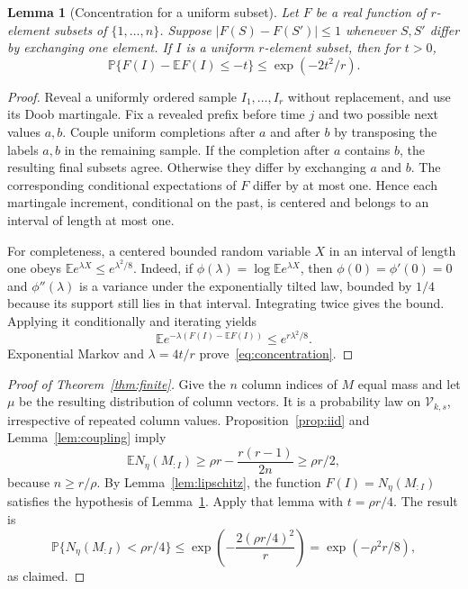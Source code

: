 \documentclass[11pt,a4paper]{article}
\newtheorem{lemma}[theorem]{Lemma}
\theoremstyle{remark}\newtheorem{remark}[theorem]{Remark}
\newcommand{\E}{\mathbb E}
\newcommand{\Prob}{\mathbb P}
\begin{document}
\begin{lemma}[Concentration for a uniform subset]\label{lem:concentration}
Let $F$ be a real function of $r$-element subsets of $\{1,\ldots,n\}$. Suppose $|F(S)-F(S')|\le1$ whenever $S,S'$ differ by exchanging one element. If $I$ is a uniform $r$-element subset, then for $t>0$,
\begin{equation}\label{eq:concentration}
 \Prob\{F(I)-\E F(I)\le-t\}\le\exp(-2t^2/r).
\end{equation}
\end{lemma}
\begin{proof}
Reveal a uniformly ordered sample $I_1,\ldots,I_r$ without replacement, and use its Doob martingale. Fix a revealed prefix before time $j$ and two possible next values $a,b$. Couple uniform completions after $a$ and after $b$ by transposing the labels $a,b$ in the remaining sample. If the completion after $a$ contains $b$, the resulting final subsets agree. Otherwise they differ by exchanging $a$ and $b$. The corresponding conditional expectations of $F$ differ by at most one. Hence each martingale increment, conditional on the past, is centered and belongs to an interval of length at most one.

For completeness, a centered bounded random variable $X$ in an interval of length one obeys $\E e^{\lambda X}\le e^{\lambda^2/8}$. Indeed, if $\phi(\lambda)=\log\E e^{\lambda X}$, then $\phi(0)=\phi'(0)=0$ and $\phi''(\lambda)$ is a variance under the exponentially tilted law, bounded by $1/4$ because its support still lies in that interval. Integrating twice gives the bound. Applying it conditionally and iterating yields
\[
 \E e^{-\lambda(F(I)-\E F(I))}\le e^{r\lambda^2/8}.
\]
Exponential Markov and $\lambda=4t/r$ prove~\eqref{eq:concentration}.
\end{proof}

\begin{proof}[Proof of Theorem~\ref{thm:finite}]
Give the $n$ column indices of $M$ equal mass and let $\mu$ be the resulting distribution of column vectors. It is a probability law on $\mathcal V_{k,s}$, irrespective of repeated column values. Proposition~\ref{prop:iid} and Lemma~\ref{lem:coupling} imply
\[
 \E N_\eta(M_{:I})\ge\rho r-\frac{r(r-1)}{2n}
 \ge\rho r/2,
\]
because $n\ge r/\rho$. By Lemma~\ref{lem:lipschitz}, the function $F(I)=N_\eta(M_{:I})$ satisfies the hypothesis of Lemma~\ref{lem:concentration}. Apply that lemma with $t=\rho r/4$. The result is
\[
 \Prob\{N_\eta(M_{:I})<\rho r/4\}
 \le\exp\!\left(-\frac{2(\rho r/4)^2}{r}\right)
 =\exp(-\rho^2r/8),
\]
as claimed.
\end{proof}
\end{document}

